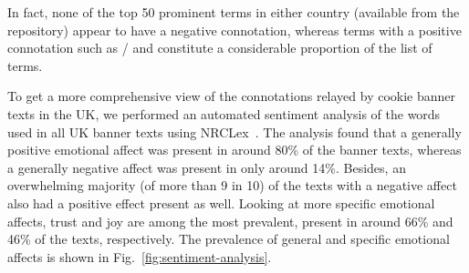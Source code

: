 In fact, none of the top 50 prominent terms in either country (available from the repository) appear to have a negative connotation, whereas terms with a positive connotation such as /\say{$\beta \varepsilon \lambda \tau \iota \acute{\omega} \sigma \varepsilon \iota$} and  constitute a considerable proportion of the list of terms. 

To get a more comprehensive view of the connotations relayed by cookie banner texts in the UK, we performed an automated sentiment analysis of the words used in all UK banner texts using NRCLex~\cite{nrclex}. 
The analysis found that a generally positive emotional affect was present in around 80\% of the banner texts, whereas a generally negative affect was present in only around 14\%. 
Besides, an overwhelming majority (of more than 9 in 10) of the texts with a negative affect also had a positive effect present as well. 
Looking at more specific emotional affects, trust and joy are among the most prevalent, present in around 66\% and 46\% of the texts, respectively. 
The prevalence of general and specific emotional affects is shown in Fig.~\ref{fig:sentiment-analysis}. 

\ukpol

\ukaff

